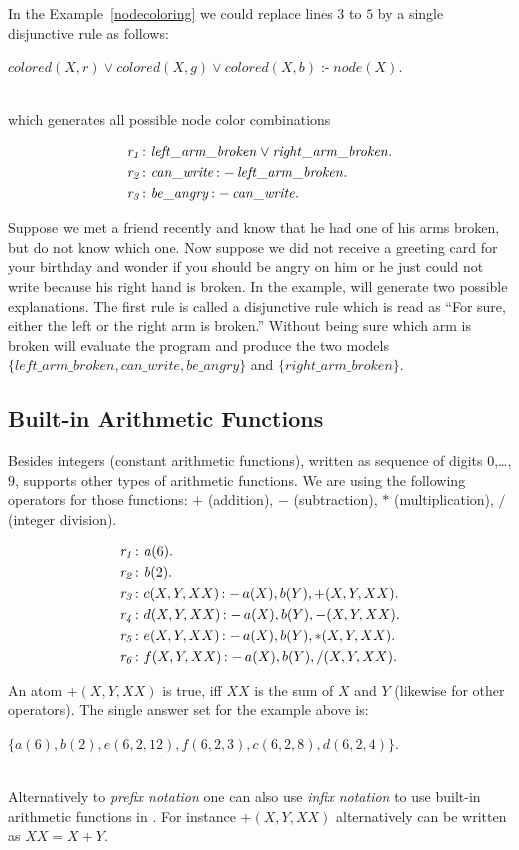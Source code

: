\documentclass[a4paper, titlepage]{article}
\DeclareMathOperator{\leftimpl}{:-}
\newcommand{\row}[1]{%
  \ensuremath{\it \color{black} #1 \color{black}}%
}
\begin{document}
In the Example~\ref{nodecoloring} we could replace lines $3$ to $5$ by a single disjunctive rule as follows:\\
\centerline{$\mathit{colored(X,r)} \vee \mathit{colored(X,g)} \vee \mathit{colored(X,b)} \leftimpl \mathit{node(X).}$} 
\\which generates all possible node color combinations 
\begin{exmp}
\begin{align*}
\row{r_1}\colon& \mathit{left\_arm\_broken} \vee 
\mathit{right\_arm\_broken}.\\
\row{r_2}\colon& \mathit{can\_write} \leftimpl 
\mathit{left\_arm\_broken}.\\
\row{r_3}\colon& \mathit{be\_angry} \leftimpl 
\mathit{can\_write}.
\end{align*}
\end{exmp}
Suppose we met a friend recently and know that he had one 
of his arms broken, but do not know which one. Now suppose 
we did not receive a greeting card for your birthday and 
wonder if you should be angry on him or he just could not 
write because his right hand is broken. In the example, 
\dlvhex{} will generate two possible explanations. The 
first rule is called a disjunctive rule which is read as 
\enquote{For sure, either the left or the right arm is broken.} Without being sure which arm is broken \dlvhex{} 
will evaluate the program and produce the two models 
$\mathit{\{left\_arm\_broken, can\_write, be\_angry\}}$ and 
$\mathit{\{right\_arm\_broken\}}$.

\subsection{Built-in Arithmetic Functions}
Besides integers (constant arithmetic functions), written 
as sequence of digits $0$,\dots,$9$, \dlvhex{} supports 
other types of arithmetic functions. We are using the 
following operators for those functions: $+$ (addition), 
$-$ (subtraction), $*$ (multiplication), $/$ (integer 
division). 
\begin{exmp}
\begin{align*}
\row{r_1}\colon& \mathit{a}(6). \\
\row{r_2}\colon& \mathit{b}(2). \\
\row{r_3}\colon& c(X,Y,XX) \leftimpl a(X), b(Y),+(X, Y, XX). \\
\row{r_4}\colon& d(X,Y,XX) \leftimpl a(X), b(Y),-(X, Y, XX). \\
\row{r_5}\colon& e(X,Y,XX) \leftimpl a(X), b(Y),*(X, Y, XX). \\
\row{r_6}\colon& f(X,Y,XX) \leftimpl a(X), b(Y),/(X, Y, XX).
\end{align*}
\end{exmp}
An atom $+(X,Y,XX)$ is true, iff $XX$ is the sum of $X$ and $Y$ (likewise for other operators).
The single answer set for the example above is:\\ 
\centerline{$\mathit{\{a(6),b(2),e(6,2,12),f(6,2,3),c(6,2,8),d(6,2,4)\}}$.}
\\Alternatively to \emph{prefix notation} one can also use 
\emph{infix notation} to use built-in arithmetic functions 
in \dlvhex{}. For instance $\mathit{+(X, Y, XX)}$ 
alternatively can be written as $\mathit{XX=X+Y}$. 
\end{document}
